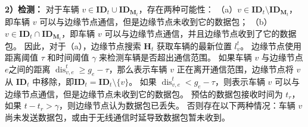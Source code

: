 \textbf{2）检测：}
对于车辆 ${v} \in \mathbf{ID}_{t} \cup \mathbf{ID}_{\mathbf{M}_{t}}$，存在两种可能性：
（a）${v} \in \mathbf{ID}_{t} \setminus \mathbf{ID}_{\mathbf{M}_{t}}$，即车辆 $v$ 可以与边缘节点通信，但是边缘节点未收到它的数据包；
（b）${v} \in \mathbf{ID}_{t} \cap \mathbf{ID}_{\mathbf{M}_{t}}$，即车辆 $v$ 可以与边缘节点通信，并且边缘节点收到了它的数据包。
因此，对于（a），边缘节点搜索 ${\mathbf{H}_{t}}$ 获取车辆的最新位置 $l_v^t$。
边缘节点使用距离阈值 $\tau$ 和时间阈值 $\gamma$ 来检测车辆是否超出通信范围。
如果车辆 $v$ 与边缘节点$e$之间的距离 $\operatorname{dis}_{v, e}^{t} \geq g_e - \tau$，那么表示车辆 $v$ 正在离开通信范围，边缘节点将 $v$ 从 $\mathbf{ID}_{t}$ 中移除，即$\mathbf{ID}_{t}=\mathbf{ID}_{t} \setminus \{v\}$。
如果 $\operatorname{dis}_{v, e}^{t} < g_e - \tau$，则表示车辆 $v$ 可以与边缘节点通信，但是边缘节点未收到它的数据包。
预估的数据包接收时间为 $t_r$，如果 $t - t_r > \gamma$，则边缘节点认为数据包已丢失。
否则存在以下两种情况：车辆 $v$ 尚未发送数据包，或由于无线通信时延导致数据包暂未收到。


